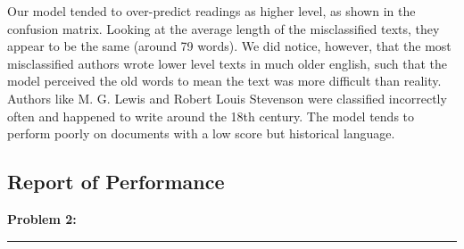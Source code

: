\documentclass{article}
\newcommand{\CustomSection}[1]{%
  \vspace{2ex}%
  \noindent\textbf{\LARGE #1}\\
  \vspace{0.5ex}%
  \textcolor{blue!50!cyan}{\rule{0.8\textwidth}{1pt}}\par
}
\begin{document}
Our model tended to over-predict readings as higher level, as shown in the confusion matrix. Looking at the average length of the misclassified texts, they appear to be the same (around 79 words). We did notice, however, that the most misclassified authors wrote lower level texts in much older english, such that the model perceived the old words to mean the text was more difficult than reality. Authors like M. G. Lewis and Robert Louis Stevenson were classified incorrectly often and happened to write around the 18th century. The model tends to perform poorly on documents with a low score but historical language.

\subsection{Report of Performance}


\CustomSection{Problem 2:}
\end{document}
